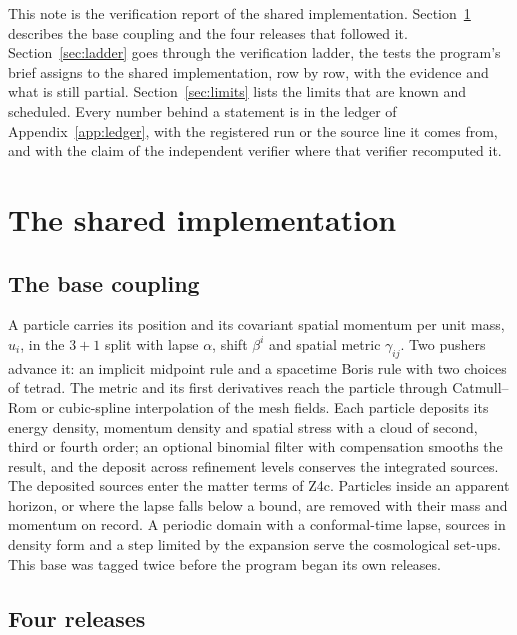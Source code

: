 \documentclass[aps,prd,twocolumn,superscriptaddress,nofootinbib,floatfix]{revtex4-2}
\begin{document}
This note is the verification report of the shared implementation. Section~\ref{sec:impl}
describes the base coupling and the four releases that followed it.
Section~\ref{sec:ladder} goes through the verification ladder, the tests the program's
brief assigns to the shared implementation, row by row, with the evidence and what is
still partial. Section~\ref{sec:limits} lists the limits that are known and scheduled.
Every number behind a statement is in the ledger of Appendix~\ref{app:ledger}, with the
registered run or the source line it comes from, and with the claim of the independent
verifier where that verifier recomputed it.

\section{The shared implementation}\label{sec:impl}

\subsection{The base coupling}

A particle carries its position and its covariant spatial momentum per unit mass, $u_i$,
in the $3+1$ split with lapse $\alpha$, shift $\beta^i$ and spatial metric
$\gamma_{ij}$. Two pushers advance it: an implicit midpoint rule and a spacetime Boris
rule with two choices of tetrad. The metric and its first derivatives reach the particle
through Catmull--Rom or cubic-spline interpolation of the mesh fields. Each particle
deposits its energy density, momentum density and spatial stress with a cloud of
second, third or fourth order; an optional binomial filter with compensation smooths the
result, and the deposit across refinement levels conserves the integrated sources. The
deposited sources enter the matter terms of Z4c. Particles inside an apparent horizon,
or where the lapse falls below a bound, are removed with their mass and momentum on
record. A periodic domain with a conformal-time lapse, sources in density form and a
step limited by the expansion serve the cosmological set-ups. This base was tagged twice
before the program began its own releases.

\subsection{Four releases}
\end{document}

